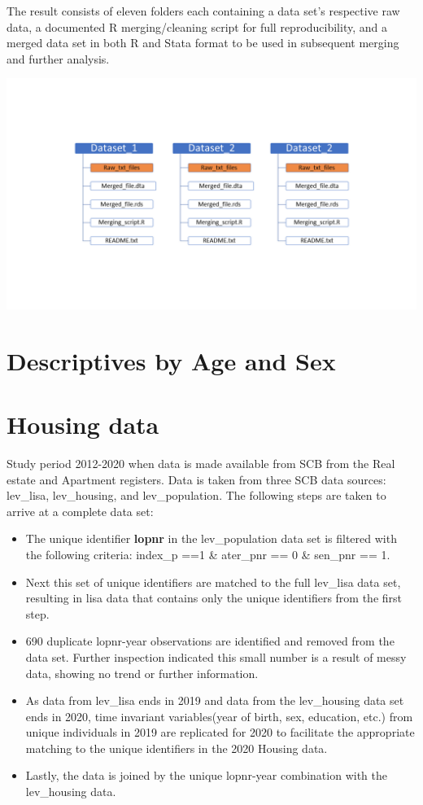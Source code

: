 \documentclass[
]{book}
\begin{document}
The result consists of eleven folders each containing a data set's respective raw data, a documented R merging/cleaning script for full reproducibility, and a merged data set in both R and Stata format to be used in subsequent merging and further analysis.

\includegraphics[width=1\linewidth]{output/figures/folder_structure}

\hypertarget{descriptives-by-age-and-sex}{%
\chapter{Descriptives by Age and Sex}\label{descriptives-by-age-and-sex}}

\hypertarget{housing-data}{%
\chapter{Housing data}\label{housing-data}}

Study period 2012-2020 when data is made available from SCB from the Real estate and Apartment registers. Data is taken from three SCB data sources: lev\_lisa, lev\_housing, and lev\_population. The following steps are taken to arrive at a complete data set:

\begin{itemize}
\item
  The unique identifier \textbf{lopnr} in the lev\_population data set is filtered with the following criteria: index\_p ==1 \& ater\_pnr == 0 \& sen\_pnr == 1.
\item
  Next this set of unique identifiers are matched to the full lev\_lisa data set, resulting in lisa data that contains only the unique identifiers from the first step.
\item
  690 duplicate lopnr-year observations are identified and removed from the data set. Further inspection indicated this small number is a result of messy data, showing no trend or further information.
\item
  As data from lev\_lisa ends in 2019 and data from the lev\_housing data set ends in 2020, time invariant variables(year of birth, sex, education, etc.) from unique individuals in 2019 are replicated for 2020 to facilitate the appropriate matching to the unique identifiers in the 2020 Housing data.
\item
  Lastly, the data is joined by the unique lopnr-year combination with the lev\_housing data.
\end{itemize}
\end{document}
